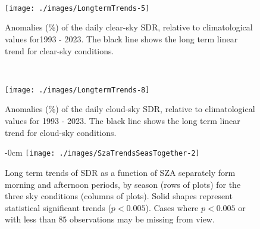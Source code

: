 \appendix
\section{}


\  \


\begin{figure}[h!]
{\centering \texttt{[image: ./images/LongtermTrends-5]}

}
\caption{Anomalies (\%) of the daily clear-sky SDR, relative to climatological values for1993 - 2023. The black line shows the long term linear trend for clear-sky conditions.}\label{fig:trendCLEAR}
\end{figure}

\  \

\begin{figure}[h!]
{\centering \texttt{[image: ./images/LongtermTrends-8]}

}
\caption{Anomalies (\%) of the daily cloud-sky SDR, relative to climatological values for 1993 - 2023. The black line shows the long term linear trend for cloud-sky conditions.}\label{fig:trendCLOUD}
\end{figure}


\begin{figure}[h!]
    \begin{adjustwidth}{-\extralength}{0cm}
        {\centering
            \texttt{[image: ./images/SzaTrendsSeasTogether-2]}
        }
        \caption{Long term trends of SDR as a function of SZA separately form morning
               and afternoon periods, by season (rows of plots) for the three sky
               conditions (columns of plots).
               Solid shapes represent statistical significant trends ($p<0.005$).
               Cases where $p<0.005$ or with less than $85$ observations may be
               missing from view.}\label{fig:SZAtrendSeason}
    \end{adjustwidth}
\end{figure}


